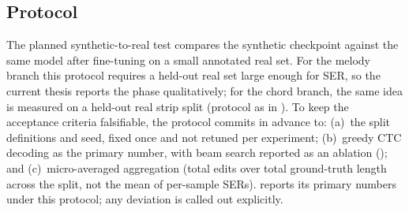 \subsection{Protocol}

The planned synthetic-to-real test compares the synthetic checkpoint
against the same model after fine-tuning on a small annotated real set.
For the melody branch this protocol requires a held-out real set large
enough for SER, so the current thesis reports the phase qualitatively;
for the chord branch, the same idea is measured on a held-out real
strip split (protocol as in ).
To keep the acceptance criteria falsifiable, the protocol commits in
advance to: (a)~the split definitions and seed, fixed once and not
retuned per experiment; (b)~greedy CTC decoding as the primary number,
with beam search reported as an ablation ();
and (c)~micro-averaged aggregation (total edits over total
ground-truth length across the split, not the mean of per-sample
SERs).  reports its primary numbers under this
protocol; any deviation is called out explicitly.
